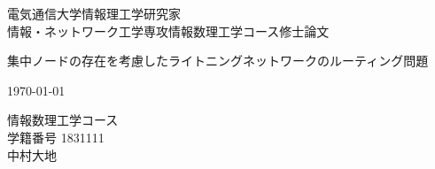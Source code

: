 \documentclass[12pt]{jarticle}
\begin{document}
\thispagestyle{empty}
\vfill
\hfill 電気通信大学情報理工学研究家 \\
\hfill 情報・ネットワーク工学専攻情報数理工学コース修士論文
%
%
\vfill
\begin{center}
  \Large 集中ノードの存在を考慮したライトニングネットワークのルーティング問題
\end{center}
\vfill
\begin{center}
  \today
\end{center}
\vfill
\begin{center}
  \large
  情報数理工学コース\\[1cm]
  学籍番号 1831111\\[1cm]
  中村大地
\end{center}
\begin{center}
  
\end{center}
\vfill
\pagebreak
\end{document}
